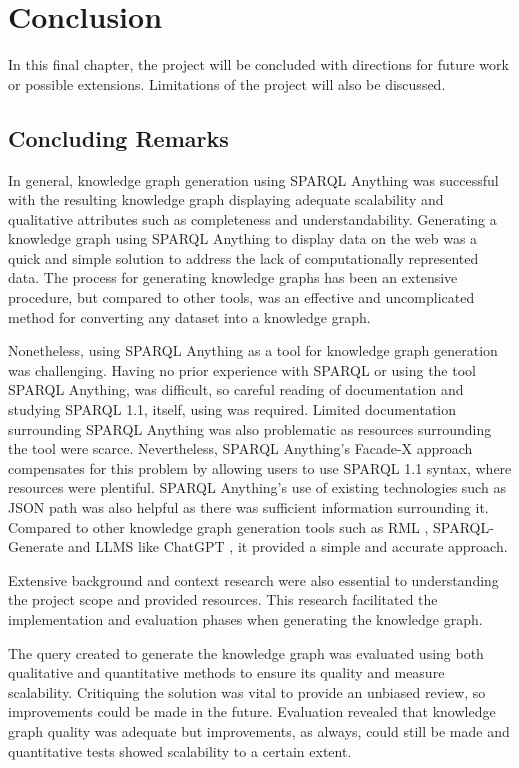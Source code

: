 \chapter{Conclusion}
In this final chapter, the project will be concluded with directions for future work or possible extensions. Limitations of the project will also be discussed. 

\section{Concluding Remarks}
\hspace{0.5cm} In general, knowledge graph generation using SPARQL Anything was successful with the resulting knowledge graph displaying adequate scalability and qualitative attributes such as completeness and understandability. Generating a knowledge graph using SPARQL Anything to display data on the web was a quick and simple solution to address the lack of computationally represented data. The process for generating knowledge graphs has been an extensive procedure, but compared to other tools, was an effective and uncomplicated method for converting any dataset into a knowledge graph. 

Nonetheless, using SPARQL Anything as a tool for knowledge graph generation was challenging. Having no prior experience with SPARQL or using the tool SPARQL Anything, was difficult, so careful reading of documentation \cite{sparqlanythinggithub} and studying SPARQL 1.1, itself, using \cite{sparlbook} was required. Limited documentation surrounding SPARQL Anything was also problematic as resources surrounding the tool were scarce. Nevertheless, SPARQL Anything's Facade-X approach compensates for this problem by allowing users to use SPARQL 1.1 syntax, where resources were plentiful. SPARQL Anything's use of existing technologies such as JSON path was also helpful as there was sufficient information surrounding it. Compared to other knowledge graph generation tools such as RML \cite{rml}, SPARQL-Generate \cite{sparqlgenerate} and LLMS like ChatGPT \cite{chatgptwebsite}, it provided a simple and accurate approach. 

Extensive background and context research were also essential to understanding the project scope and provided resources. This research facilitated the implementation and evaluation phases when generating the knowledge graph.

The query created to generate the knowledge graph was evaluated using both qualitative and quantitative methods to ensure its quality and measure scalability. Critiquing the solution was vital to provide an unbiased review, so improvements could be made in the future. Evaluation revealed that knowledge graph quality was adequate but improvements, as always, could still be made and quantitative tests showed scalability to a certain extent. 

